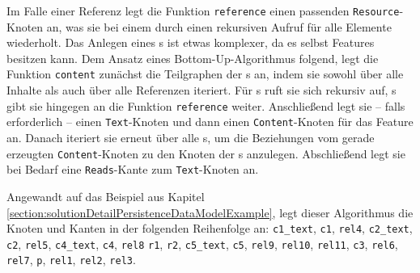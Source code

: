     

    Im Falle einer Referenz legt die Funktion \texttt{reference} einen passenden \texttt{Resource}-Knoten an,   
    was sie bei einem {\collectionFeature} durch einen rekursiven Aufruf für alle Elemente wiederholt.
    Das Anlegen eines {\contentFeature}s ist etwas komplexer,
    da es selbst Features besitzen kann.
    Dem Ansatz eines Bottom-Up-Algorithmus folgend, legt die Funktion \texttt{content}
    zunächst die Teilgraphen der {\childFeature}s an,
    indem sie sowohl über alle Inhalte als auch über alle Referenzen iteriert.
    Für {\contentFeature}s ruft sie sich rekursiv auf,
    {}s gibt sie hingegen an die Funktion \texttt{reference} weiter.
    Anschließend legt sie -- falls erforderlich -- einen \texttt{Text}-Knoten und dann einen \texttt{Content}-Knoten
    für das Feature an.
    Danach iteriert sie erneut über alle {\childFeature}s, um die Beziehungen vom
    gerade erzeugten \texttt{Content}-Knoten zu den Knoten der {\childFeature}s anzulegen.
    Abschließend legt sie bei Bedarf eine \texttt{Reads}-Kante zum \texttt{Text}-Knoten an.

    Angewandt auf das Beispiel aus Kapitel \ref{section:solutionDetailPersistenceDataModelExample},
    legt dieser Algorithmus die Knoten und Kanten in der folgenden Reihenfolge an:
    \texttt{c1\_text}, \texttt{c1}, \texttt{rel4},
    \texttt{c2\_text}, \texttt{c2}, \texttt{rel5},
    \texttt{c4\_text}, \texttt{c4}, \texttt{rel8}
    \texttt{r1}, \texttt{r2}, \texttt{c5\_text}, \texttt{c5},
    \texttt{rel9}, \texttt{rel10}, \texttt{rel11},
    \texttt{c3}, \texttt{rel6}, \texttt{rel7},
    \texttt{p}, \texttt{rel1}, \texttt{rel2}, \texttt{rel3}.